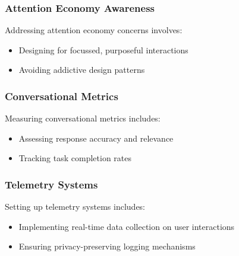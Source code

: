 \documentclass[14pt,a4paper]{article}
\begin{document}
\begin{multicols}{2}
\subsubsection{Attention Economy Awareness}
Addressing attention economy concerns \textit{\parencite[pp. 10-30]{Williams2024}} involves:
\begin{itemize}
    \item Designing for focussed, purposeful interactions
    \item Avoiding addictive design patterns
\end{itemize}









\subsubsection{Conversational Metrics}
Measuring conversational metrics \textit{\parencite[pp. 1-32]{Quarteroni2024}} includes:
\begin{itemize}
    \item Assessing response accuracy and relevance
    \item Tracking task completion rates
\end{itemize}

\subsubsection*{Telemetry Systems}
Setting up telemetry systems \textit{\parencite[pp. 30-60]{Vadapalli2023}} includes:
\begin{itemize}
    \item Implementing real-time data collection on user interactions
    \item Ensuring privacy-preserving logging mechanisms
\end{itemize}


\end{multicols}
\end{document}
